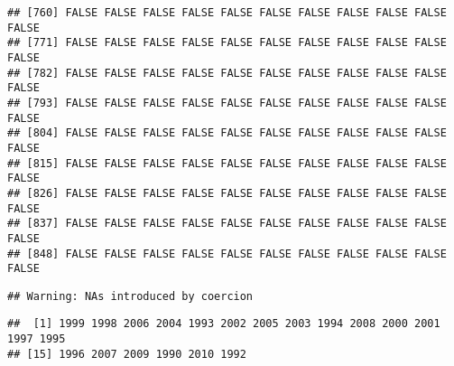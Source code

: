 \documentclass[]{article}
\newenvironment{Shaded}{\begin{snugshade}}{\end{snugshade}}
\newcommand{\CommentTok}[1]{\textcolor[rgb]{0.56,0.35,0.01}{\textit{#1}}}
\newcommand{\KeywordTok}[1]{\textcolor[rgb]{0.13,0.29,0.53}{\textbf{#1}}}
\newcommand{\NormalTok}[1]{#1}
\newcommand{\OperatorTok}[1]{\textcolor[rgb]{0.81,0.36,0.00}{\textbf{#1}}}
\newcommand{\StringTok}[1]{\textcolor[rgb]{0.31,0.60,0.02}{#1}}
\begin{document}
\begin{verbatim}
## [760] FALSE FALSE FALSE FALSE FALSE FALSE FALSE FALSE FALSE FALSE FALSE
## [771] FALSE FALSE FALSE FALSE FALSE FALSE FALSE FALSE FALSE FALSE FALSE
## [782] FALSE FALSE FALSE FALSE FALSE FALSE FALSE FALSE FALSE FALSE FALSE
## [793] FALSE FALSE FALSE FALSE FALSE FALSE FALSE FALSE FALSE FALSE FALSE
## [804] FALSE FALSE FALSE FALSE FALSE FALSE FALSE FALSE FALSE FALSE FALSE
## [815] FALSE FALSE FALSE FALSE FALSE FALSE FALSE FALSE FALSE FALSE FALSE
## [826] FALSE FALSE FALSE FALSE FALSE FALSE FALSE FALSE FALSE FALSE FALSE
## [837] FALSE FALSE FALSE FALSE FALSE FALSE FALSE FALSE FALSE FALSE FALSE
## [848] FALSE FALSE FALSE FALSE FALSE FALSE FALSE FALSE FALSE FALSE FALSE
\end{verbatim}

\begin{Shaded}
\end{Shaded}

\begin{verbatim}
## Warning: NAs introduced by coercion
\end{verbatim}

\begin{Shaded}
\end{Shaded}

\begin{verbatim}
##  [1] 1999 1998 2006 2004 1993 2002 2005 2003 1994 2008 2000 2001 1997 1995
## [15] 1996 2007 2009 1990 2010 1992
\end{verbatim}

\begin{Shaded}
\end{Shaded}
\end{document}
